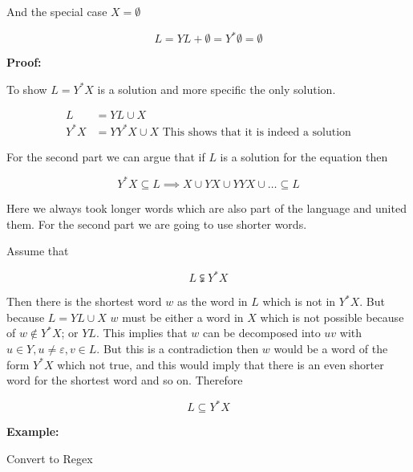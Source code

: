 And the special case \(X = \emptyset\)

\[
L = YL + \emptyset = Y^* \emptyset = \emptyset
\]

\textbf{Proof:}

To show \(L = Y^*X\) is a solution and more specific the only solution.

\begin{align*}
    L &= YL \cup X\\
    Y^*X &= YY^*X \cup X \text{ This shows that it is indeed a solution}
\end{align*}

For the second part we can argue that if \(L\) is a solution for the equation then 

\[
    Y^*X \subseteq L \implies X \cup YX \cup YYX \cup \dots \subseteq L
\]

Here we always took longer words which are also part of the language and united them. For the second 
part we are going to use shorter words.

Assume that

\[
    L \subsetneqq Y^*X 
\]

Then there is the shortest word \(w\) as the word in \(L\) which is not in \(Y^*X\). But 
because \(L = YL \cup X\) \(w\) must be either a word in \(X\) which is not possible because of 
\(w \notin Y^*X\); or \(YL\). This implies that \(w\) can be decomposed into \(uv\) with 
\(u \in Y, u \neq \varepsilon, v \in L\). But this is a contradiction then \(w\) would be a word of the 
form \(Y^*X\) which not true, and this would imply that there is an even shorter word for the shortest word 
and so on. Therefore 

\[
    L \subseteq Y^*X  
\]

\QED

\textbf{Example:}

Convert to Regex

\begin{center}
\end{center}

